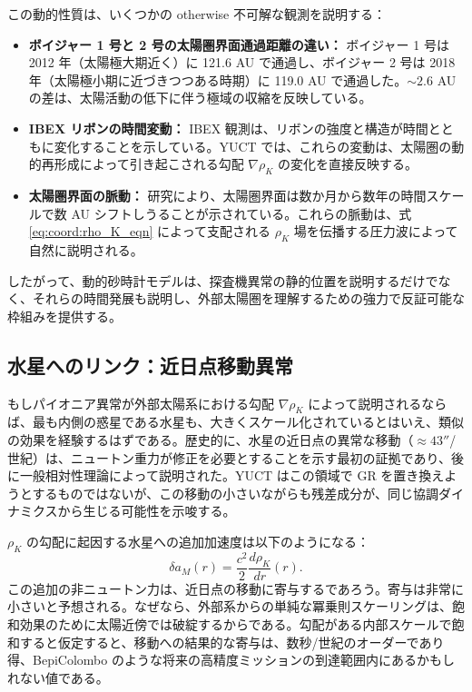 \documentclass[11pt,a4paper]{article}
\theoremstyle{remark}
\begin{document}
	この動的性質は、いくつかの otherwise 不可解な観測を説明する：
	\begin{itemize}
		\item \textbf{ボイジャー 1 号と 2 号の太陽圏界面通過距離の違い：} ボイジャー 1 号は 2012 年（太陽極大期近く）に 121.6 AU で通過し、ボイジャー 2 号は 2018 年（太陽極小期に近づきつつある時期）に 119.0 AU で通過した。$\sim2.6$ AU の差は、太陽活動の低下に伴う極域の収縮を反映している。
		
		\item \textbf{IBEX リボンの時間変動：} IBEX 観測は、リボンの強度と構造が時間とともに変化することを示している。YUCT では、これらの変動は、太陽圏の動的再形成によって引き起こされる勾配 $\nabla \rho_K$ の変化を直接反映する。
		
		\item \textbf{太陽圏界面の脈動：} 研究により、太陽圏界面は数か月から数年の時間スケールで数 AU シフトしうることが示されている。これらの脈動は、式 \eqref{eq:coord:rho_K_eqn} によって支配される $\rho_K$ 場を伝播する圧力波によって自然に説明される。
	\end{itemize}
	
	したがって、動的砂時計モデルは、探査機異常の静的位置を説明するだけでなく、それらの時間発展も説明し、外部太陽圏を理解するための強力で反証可能な枠組みを提供する。
	
	\subsection{水星へのリンク：近日点移動異常}
	\label{subsec:coord:mercury}
	
	もしパイオニア異常が外部太陽系における勾配 $\nabla \rho_K$ によって説明されるならば、最も内側の惑星である水星も、大きくスケール化されているとはいえ、類似の効果を経験するはずである。歴史的に、水星の近日点の異常な移動（$\approx 43''$/世紀）は、ニュートン重力が修正を必要とすることを示す最初の証拠であり、後に一般相対性理論によって説明された。YUCT はこの領域で GR を置き換えようとするものではないが、この移動の小さいながらも残差成分が、同じ協調ダイナミクスから生じる可能性を示唆する。
	
	$\rho_K$ の勾配に起因する水星への追加加速度は以下のようになる：
	\begin{equation}
		\delta a_M(r) = \frac{c^2}{2} \frac{d\rho_K}{dr}(r).
	\end{equation}
	この追加の非ニュートン力は、近日点の移動に寄与するであろう。寄与は非常に小さいと予想される。なぜなら、外部系からの単純な冪乗則スケーリングは、飽和効果のために太陽近傍では破綻するからである。勾配がある内部スケールで飽和すると仮定すると、移動への結果的な寄与は、数秒/世紀のオーダーであり得、BepiColombo のような将来の高精度ミッションの到達範囲内にあるかもしれない値である。
	
\end{document}
